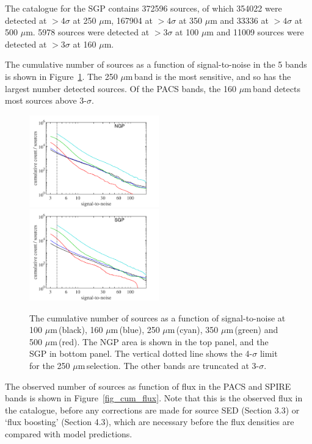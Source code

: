 \documentclass[useAMS,usenatbib]{mnras}
\def\mic{ $\mu $m\,}
\begin{document}
The catalogue for the SGP contains 372596 sources, of which 354022 were
detected at $>4\sigma$ at 250 $\mu$m, 167904 at $>4\sigma$ at 350 $\mu$m
and 33336 at $>4\sigma$ at 500 $\mu$m.  5978 sources were detected at
$>3\sigma$ at 100 $\mu$m and 11009 sources were detected at $>3\sigma$
at 160 $\mu$m.

The cumulative number of sources as a function of signal-to-noise in
the 5 bands is shown in Figure~\ref{fig_sn}. The 250\mic band is
the most sensitive, and so has the largest number detected sources. Of
the PACS bands, the 160\mic band detects most sources above
3-$\sigma$.

\begin{figure}
  \includegraphics[width=0.5\textwidth]{cum_sn_NGP.pdf}
\includegraphics[width=0.5\textwidth]{cum_sn_SGP.pdf}
 \caption{\protect\label{fig_sn} The cumulative number of sources as a function
   of signal-to-noise at 100\mic (black), 160\mic (blue), 250\mic (cyan),
  350\mic (green) and 500\mic (red). The NGP area is shown in the top panel,
  and the SGP in bottom panel. The vertical dotted line shows the
  4-$\sigma$ limit for the 250\mic selection. The other bands are
  truncated at 3-$\sigma$.  
} 
\end{figure}


The observed number of sources as function of flux in the PACS and
SPIRE bands is shown in Figure~\ref{fig_cum_flux}.  Note that this is
the observed flux in the catalogue, before any corrections are made
for source SED (Section 3.3) or `flux boosting' (Section 4.3), which
are necessary before the flux densities are compared with model
predictions. 
\end{document}
